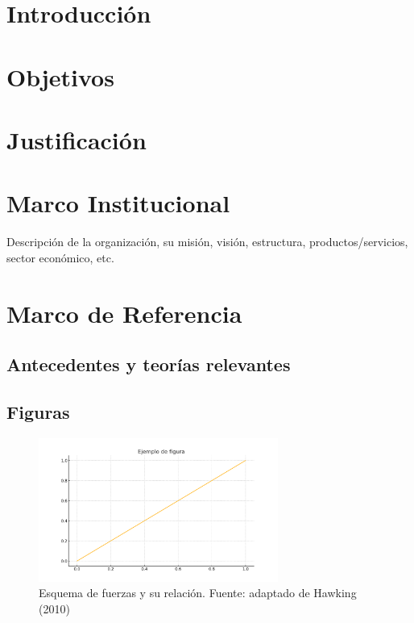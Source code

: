 \documentclass[12pt]{article}
\newcommand{\chapterbreak}{\clearpage \thispagestyle{fancy}}
\begin{document}
\chapterbreak
\tableofcontents
\newpage
\listoffigures
\listoftables


\chapterbreak
\section{Introducción}


\chapterbreak
\section{Objetivos}


\chapterbreak
\section{Justificación}


\chapterbreak
\section{Marco Institucional}
Descripción de la organización, su misión, visión, estructura, productos/servicios, sector económico, etc.

\chapterbreak
\section{Marco de Referencia}
\subsection*{Antecedentes y teorías relevantes}
\subsection*{Figuras}
\begin{figure}[H]
\centering
\includegraphics[width=0.7\textwidth]{assets/figura1.png}
\caption{Esquema de fuerzas y su relación. Fuente: adaptado de Hawking (2010)}
\end{figure}
\end{document}
